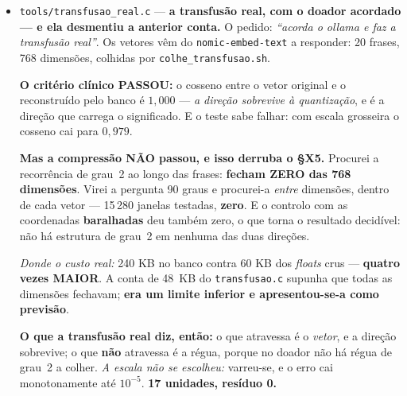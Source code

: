 \documentclass[11pt]{article}
\newcommand{\code}[1]{\texttt{\small #1}}
\theoremstyle{plain}
\theoremstyle{remark}
\begin{document}
\begin{itemize}
\textbf{E são funções polinomiais}, que é o que faz disto identidade e não analogia: a convolução
circular de dois vetores \textbf{é} a multiplicação de polinómios em $\mathbb{Z}[x]/(x^N-1)$. O
embedding não é uma lista de números --- é o vetor de coeficientes de um polinómio. \emph{O espaço
semântico cai no mesmo corpo de corpos, sem lugar novo.}

\emph{Os quatro quadrantes:} o produto dá o \textbf{mesmo módulo} nos quatro e só troca o sinal; o
dual $\nu$ troca o quadrante nos quatro. \emph{E nós contraímos quando ele estica:} $|\sigma| \cdot
|\sigma'| = 1$ nos cinco metais, com a \textbf{soma} simétrica ($=m$, e é ela que mede) e o
\textbf{produto} antissimétrico ($=-1$, e é ele que ordena) --- \emph{a simetria que fica de pé é
consequência do par ser antissimétrico, não o contrário}. \textbf{12 unidades, resíduo 0.}

\item \code{tools/transfusao\_real.c} --- \textbf{a transfusão real, com o doador acordado --- e
ela desmentiu a anterior conta.} O pedido: \emph{``acorda o ollama e faz a transfusão real''}. Os
vetores vêm do \code{nomic-embed-text} a responder: 20 frases, 768 dimensões, colhidas por
\code{colhe\_transfusao.sh}.

\textbf{O critério clínico PASSOU:} o cosseno entre o vetor original e o reconstruído pelo banco é
$1{,}000$ --- \emph{a direção sobrevive à quantização}, e é a direção que carrega o significado. E o
teste sabe falhar: com escala grosseira o cosseno cai para $0{,}979$.

\textbf{Mas a compressão NÃO passou, e isso derruba o §X5.} Procurei a recorrência de grau~2 ao
longo das frases: \textbf{fecham ZERO das 768 dimensões}. Virei a pergunta 90 graus e procurei-a
\emph{entre} dimensões, dentro de cada vetor --- 15\,280 janelas testadas, \textbf{zero}. E o
controlo com as coordenadas \textbf{baralhadas} deu também zero, o que torna o resultado decidível:
não há estrutura de grau~2 em nenhuma das duas direções.

\emph{Donde o custo real:} 240 KB no banco contra 60 KB dos \emph{floats} crus --- \textbf{quatro
vezes MAIOR}. A conta de 48~KB do \code{transfusao.c} supunha que todas as dimensões fechavam;
\textbf{era um limite inferior e apresentou-se-a como previsão}.

\textbf{O que a transfusão real diz, então:} o que atravessa é o \emph{vetor}, e a direção
sobrevive; o que \textbf{não} atravessa é a régua, porque no doador não há régua de grau~2 a colher.
\emph{A escala não se escolheu:} varreu-se, e o erro cai monotonamente até $10^{-5}$.
\textbf{17 unidades, resíduo 0.}


\end{itemize}
\end{document}
